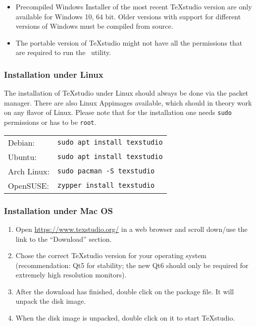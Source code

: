 				\begin{daWarningBox}
					\begin{itemize}[leftmargin=*]
						\setlength\itemsep{-0.1em}
						\item Precompiled Windows Installer of the most recent TeXstudio version are only available for Windows 10, 64 bit. Older versions with support for different versions of Windows must be compiled from source.
						\item  The portable version of TeXstudio might not have all the permissions that are required to run the \productName~utility.
					\end{itemize}
				\end{daWarningBox}
			
			\newpage
			\subsubsection{Installation under Linux}
				The installation of TeXstudio under Linux should always be done via the packet manager. There are also Linux Appimages available, which should in theory work on any flavor of Linux. 
				\newline Please note that for the installation one needs \lstinline$sudo$ permissions or has to be \lstinline$root$.
				\begin{longtable}[c]{ll}
					\rowcolor{white}
					\multicolumn{2}{l}{\textbf{Installation command:}}\\
					\midrule
					\endfirsthead
					Debian: & \lstinline$sudo apt install texstudio$\\
					Ubuntu: & \lstinline$sudo apt install texstudio$\\
					Arch Linux: & \lstinline$sudo pacman -S texstudio$  \\
					OpenSUSE: & \lstinline$zypper install texstudio$\\
					\midrule
				\end{longtable}
				
			\subsubsection{Installation under Mac OS}
				\begin{enumerate}[label={\color{docartTurquoise}Step \arabic*:},leftmargin=*]
					\setlength\itemsep{-0.2em}
					\item Open \href{https://www.texstudio.org/}{https://www.texstudio.org/} in a web browser and scroll down/use the link to the \enquote{Download} section.
					\item Chose the correct TeXstudio version for your operating system (recommendation: Qt5 for stability; the new Qt6 should only be required for extremely high resolution monitors).
					\item After the download has finished, double click on the package file. It will unpack the disk image.
					\item When the disk image is unpacked, double click on it to start TeXstudio.
				\end{enumerate}
				
